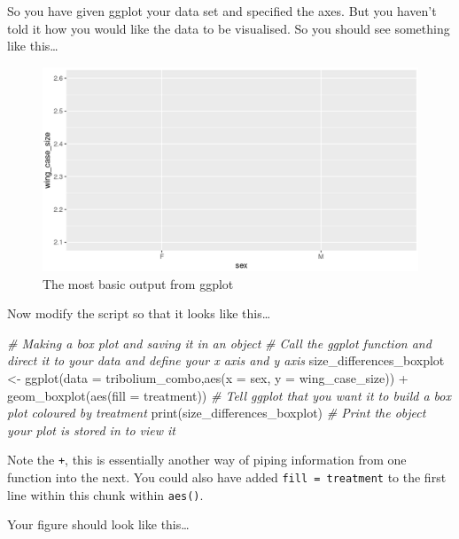 \documentclass[
]{book}
\newenvironment{Shaded}{\begin{snugshade}}{\end{snugshade}}
\newcommand{\AttributeTok}[1]{\textcolor[rgb]{0.77,0.63,0.00}{#1}}
\newcommand{\CommentTok}[1]{\textcolor[rgb]{0.56,0.35,0.01}{\textit{#1}}}
\newcommand{\FunctionTok}[1]{\textcolor[rgb]{0.00,0.00,0.00}{#1}}
\newcommand{\NormalTok}[1]{#1}
\newcommand{\OtherTok}[1]{\textcolor[rgb]{0.56,0.35,0.01}{#1}}
\newcommand{\SpecialCharTok}[1]{\textcolor[rgb]{0.00,0.00,0.00}{#1}}
\begin{document}
So you have given ggplot your data set and specified the axes. But you haven't told it how you would like the data to be visualised. So you should see something like this\ldots{}

\begin{figure}
\includegraphics[width=0.9\linewidth]{figures/screenshot_deconstructingaplot_1} \caption{The most basic output from ggplot}\label{fig:unnamed-chunk-50}
\end{figure}

Now modify the script so that it looks like this\ldots{}

\begin{Shaded}
\begin{Highlighting}[]
\CommentTok{\# Making a box plot and saving it in an object}
\CommentTok{\# Call the ggplot function and direct it to your data and define your x axis and y axis}
\NormalTok{size\_differences\_boxplot }\OtherTok{\textless{}{-}} \FunctionTok{ggplot}\NormalTok{(}\AttributeTok{data =}\NormalTok{ tribolium\_combo,}\FunctionTok{aes}\NormalTok{(}\AttributeTok{x =}\NormalTok{ sex, }\AttributeTok{y =}\NormalTok{ wing\_case\_size)) }\SpecialCharTok{+} 
  \FunctionTok{geom\_boxplot}\NormalTok{(}\FunctionTok{aes}\NormalTok{(}\AttributeTok{fill =}\NormalTok{ treatment)) }\CommentTok{\# Tell ggplot that you want it to build a box plot coloured by treatment}
\FunctionTok{print}\NormalTok{(size\_differences\_boxplot) }\CommentTok{\# Print the object your plot is stored in to view it}
\end{Highlighting}
\end{Shaded}

Note the \texttt{+}, this is essentially another way of piping information from one function into the next. You could also have added \texttt{fill\ =\ treatment} to the first line within this chunk within \texttt{aes()}.

Your figure should look like this\ldots{}
\end{document}
